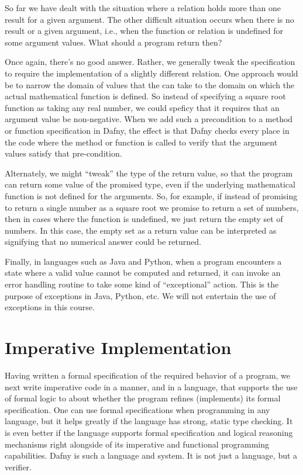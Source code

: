 \documentclass[letterpaper,10pt,english]{sphinxmanual}
\begin{document}
So far we have dealt with the situation where a relation holds more
than one result for a given argument. The other difficult situation
occurs when there is no result or a given argument, i.e., when the
function or relation is undefined for some argument values. What
should a program return then?

Once again, there’s no good answer. Rather, we generally tweak the
specification to require the implementation of a slightly different
relation. One approach would be to narrow the domain of values that
the  can take to the domain on which the actual mathematical
function is defined. So instead of specifying a square root function
as taking any real number, we could speficy that it requires that an
argument value be non-negative. When we add such a precondition to a
method or function specification in Dafny, the effect is that Dafny
checks every place in the code where the method or function is called
to verify that the argument values satisfy that pre-condition.

Alternately, we might “tweak” the type of the return value, so that
the program can return some value of the promised type, even if the
underlying mathematical function is not defined for the arguments. So,
for example, if instead of promising to return a single number as a
square root we promise to return a set of numbers, then in cases where
the function is undefined, we just return the empty set of numbers.
In this case, the empty set as a return value can be interpreted as
signifying that no numerical answer could be returned.

Finally, in languages such as Java and Python, when a program
encounters a state where a valid value cannot be computed and
returned, it can invoke an error handling routine to take some kind of
“exceptional” action. This is the purpose of exceptions in Java,
Python, etc. We will not entertain the use of exceptions in this
course.


\section{Imperative Implementation}
\label{\detokenize{05-verifying-logical-specifications:imperative-implementation}}
Having written a formal specification of the required 
behavior of a program, we next write imperative code in a manner, and
in a language, that supports the use of formal logic to  about
whether the program refines (implements) its formal specification. One
can use formal specifications when programming in any language, but it
helps greatly if the language has strong, static type checking. It is
even better if the language supports formal specification and logical
reasoning mechanisms right alongside of its imperative and functional
programming capabilities. Dafny is such a language and system. It is
not just a language, but a verifier.
\end{document}
